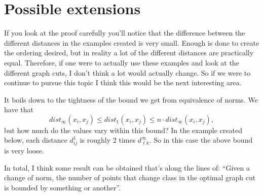 \documentclass{article}[11pt]
\begin{document}
\section{Possible extensions}

If you look at the proof carefully you'll notice that the difference between the different distances in the examples created is very small. Enough is done to create the ordering desired, but in reality a lot of the different distances are practically equal. Therefore, if one were to actually use these examples and look at the different graph cuts, I don't think a lot would actually change. So if we were to continue to pursue this topic I think this would be the next interesting area.

It boils down to the tightness of the bound we get from equivalence of norms. We have that
\[dist_\infty(x_i,x_j) \leq dist_1(x_i,x_j) \leq n\cdot dist_\infty(x_i,x_j),\]
but how much do the values vary within this bound? In the example created below, each distance $d_{ij}^1$ is roughly 2 times $d_{\ell k}^\infty$. So in this case the above bound is very loose.

In total, I think some result can be obtained that's along the lines of: ``Given a change of norm, the number of points that change class in the optimal graph cut is bounded by something or another''.
\end{document}
